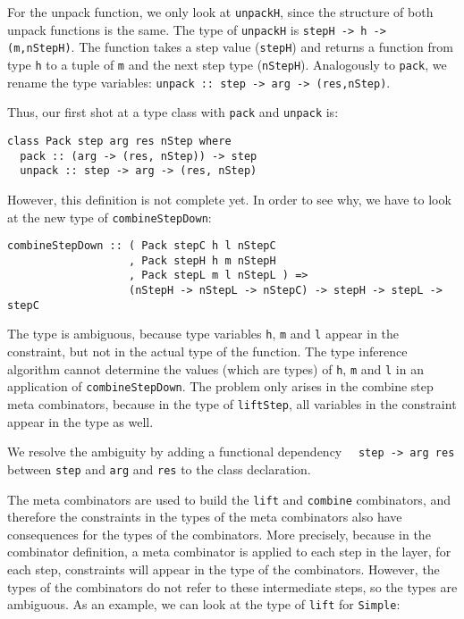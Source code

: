 For the unpack function, we only look at \texttt{unpackH}, since the structure of both unpack functions is the same. The type of \texttt{unpackH} is \texttt{stepH -> h -> (m,nStepH)}. The function takes a step value (\texttt{stepH}) and returns a function from type \texttt{h} to a tuple of \texttt{m} and the next step type (\texttt{nStepH}). Analogously to \texttt{pack}, we rename the type variables: \texttt{unpack :: step -> arg -> (res,nStep)}. 

Thus, our first shot at a type class with \texttt{pack} and \texttt{unpack} is:

\begin{small}
\begin{verbatim}
class Pack step arg res nStep where
  pack :: (arg -> (res, nStep)) -> step
  unpack :: step -> arg -> (res, nStep)
\end{verbatim}
\end{small}

However, this definition is not complete yet. In order to see why, we have to look at the new type of \texttt{combineStepDown}:

\begin{small}
\begin{verbatim}
combineStepDown :: ( Pack stepC h l nStepC 
                   , Pack stepH h m nStepH
                   , Pack stepL m l nStepL ) => 
                   (nStepH -> nStepL -> nStepC) -> stepH -> stepL -> stepC
\end{verbatim}
\end{small}

The type is ambiguous, because type variables \texttt{h}, \texttt{m} and \texttt{l} appear in the constraint, but not in the actual type of the function. The type inference algorithm cannot determine the values (which are types) of \texttt{h}, \texttt{m} and \texttt{l} in an application of \texttt{combineStepDown}. The problem only arises in the combine step meta combinators, because in the type of \texttt{liftStep}, all variables in the constraint appear in the type as well.

We resolve the ambiguity by adding a functional dependency~\cite{fundep}~ \texttt{step -> arg res} between \texttt{step} and \texttt{arg} and \texttt{res} to the class declaration.

The meta combinators are used to build the \texttt{lift} and \texttt{combine} combinators, and therefore the constraints in the types of the meta combinators also have consequences for the types of the combinators. More precisely, because in the combinator definition, a meta combinator is applied to each step in the layer, for each step, constraints will appear in the type of the combinators. However, the types of the combinators do not refer to these intermediate steps, so the types are ambiguous. As an example, we can look at the type of \texttt{lift} for \texttt{Simple}:

